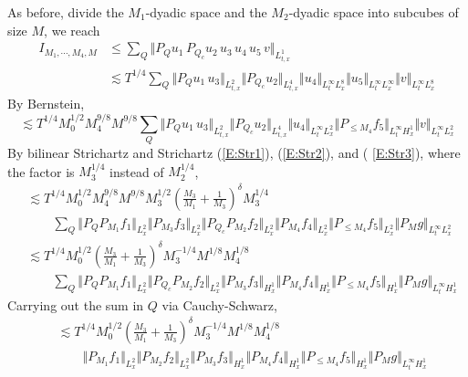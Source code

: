 \documentclass[12pt,letterpaper,leqno]{amsart}
\theoremstyle{plain}
\numberwithin{equation}{section}
\numberwithin{theorem}{section}
\numberwithin{proposition}{section}
\numberwithin{lemma}{section}
\numberwithin{corollary}{section}
\begin{document}
As before, divide the $M_{1}$-dyadic space and the $M_{2}$-dyadic space into
subcubes of size $M$, we reach 
\begin{align*}
I_{M_{1},\cdots ,M_{4},M}& \leq \sum_{Q}\Vert
P_{Q}u_{1}\,P_{Q_{c}}u_{2}\,u_{3}\,u_{4}\,u_{5}\,v\Vert _{L_{t,x}^{1}} \\
& \lesssim T^{1/4}\sum_{Q}\Vert P_{Q}u_{1}\,u_{3}\Vert _{L_{t,x}^{2}}\Vert
P_{Q_{c}}u_{2}\Vert _{L_{t,x}^{4}}\Vert u_{4}\Vert _{L_{t}^{\infty
}L_{x}^{8}}\Vert u_{5}\Vert _{L_{t}^{\infty }L_{x}^{\infty }}\Vert v\Vert
_{L_{t}^{\infty }L_{x}^{8}}
\end{align*}%
By Bernstein, 
\begin{equation*}
\lesssim T^{1/4}M_{0}^{1/2}M_{4}^{9/8}M^{9/8}\sum_{Q}\Vert
P_{Q}u_{1}\,u_{3}\Vert _{L_{t,x}^{2}}\Vert P_{Q_{c}}u_{2}\Vert
_{L_{t,x}^{4}}\Vert u_{4}\Vert _{L_{t}^{\infty }L_{x}^{2}}\Vert P_{\leq
M_{4}}f_{5}\Vert _{L_{t}^{\infty }H_{x}^{1}}\Vert v\Vert _{L_{t}^{\infty
}L_{x}^{2}}
\end{equation*}%
By bilinear Strichartz and Strichartz (\ref{E:Str1}), (\ref{E:Str2}), and (%
\ref{E:Str3}), where the factor is $M_{3}^{1/4}$ instead of $M_{2}^{1/4}$, 
\begin{align*}
& \lesssim T^{1/4}M_{0}^{1/2}M_{4}^{9/8}M^{9/8}M_{3}^{1/2}(\frac{M_{3}}{M_{1}%
}+\frac{1}{M_{3}})^{\delta }M_{3}^{1/4} \\
& \qquad \sum_{Q}\Vert P_{Q}P_{M_{1}}f_{1}\Vert _{L_{x}^{2}}\Vert
P_{M_{3}}f_{3}\Vert _{L_{x}^{2}}\Vert P_{Q_{c}}P_{M_{2}}f_{2}\Vert
_{L_{x}^{2}}\Vert P_{M_{4}}f_{4}\Vert _{L_{x}^{2}}\Vert P_{\leq
M_{4}}f_{5}\Vert _{L_{x}^{2}}\Vert P_{M}g\Vert _{L_{t}^{\infty }L_{x}^{2}} \\
& \lesssim T^{1/4}M_{0}^{1/2}(\frac{M_{3}}{M_{1}}+\frac{1}{M_{3}})^{\delta
}M_{3}^{-1/4}M^{1/8}M_{4}^{1/8} \\
& \qquad \sum_{Q}\Vert P_{Q}P_{M_{1}}f_{1}\Vert _{L_{x}^{2}}\Vert
P_{Q_{c}}P_{M_{2}}f_{2}\Vert _{L_{x}^{2}}\Vert P_{M_{3}}f_{3}\Vert
_{H_{x}^{1}}\Vert P_{M_{4}}f_{4}\Vert _{H_{x}^{1}}\Vert P_{\leq
M_{4}}f_{5}\Vert _{H_{x}^{1}}\Vert P_{M}g\Vert _{L_{t}^{\infty }H_{x}^{1}}
\end{align*}%
Carrying out the sum in $Q$ via Cauchy-Schwarz, 
\begin{align*}
& \lesssim T^{1/4}M_{0}^{1/2}(\frac{M_{3}}{M_{1}}+\frac{1}{M_{3}})^{\delta
}M_{3}^{-1/4}M^{1/8}M_{4}^{1/8} \\
& \qquad \Vert P_{M_{1}}f_{1}\Vert _{L_{x}^{2}}\Vert P_{M_{2}}f_{2}\Vert
_{L_{x}^{2}}\Vert P_{M_{3}}f_{3}\Vert _{H_{x}^{1}}\Vert P_{M_{4}}f_{4}\Vert
_{H_{x}^{1}}\Vert P_{\leq M_{4}}f_{5}\Vert _{H_{x}^{1}}\Vert P_{M}g\Vert
_{L_{t}^{\infty }H_{x}^{1}}
\end{align*}%
\end{document}

